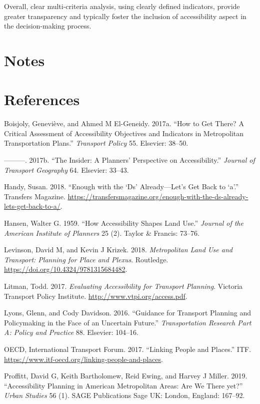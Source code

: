 \documentclass[12pt,]{article}
\begin{document}
Overall, clear multi-criteria analysis, using clearly defined
indicators, provide greater transparency and typically foster the
inclusion of accessibility aspect in the decision-making process.

\hypertarget{notes}{%
\section{Notes}\label{notes}}

\hypertarget{references}{%
\section*{References}\label{references}}

\hypertarget{refs}{}
\leavevmode\hypertarget{ref-boisjoly2017get}{}%
Boisjoly, Geneviève, and Ahmed M El-Geneidy. 2017a. ``How to Get There?
A Critical Assessment of Accessibility Objectives and Indicators in
Metropolitan Transportation Plans.'' \emph{Transport Policy} 55.
Elsevier: 38--50.

\leavevmode\hypertarget{ref-boisjoly2017insider}{}%
---------. 2017b. ``The Insider: A Planners' Perspective on
Accessibility.'' \emph{Journal of Transport Geography} 64. Elsevier:
33--43.

\leavevmode\hypertarget{ref-handy2018enough}{}%
Handy, Susan. 2018. ``Enough with the `Ds' Already---Let's Get Back to
`a'.'' Transfers Magazine.
\url{https://transfersmagazine.org/enough-with-the-ds-already-lets-get-back-to-a/}.

\leavevmode\hypertarget{ref-hansen1959accessibility}{}%
Hansen, Walter G. 1959. ``How Accessibility Shapes Land Use.''
\emph{Journal of the American Institute of Planners} 25 (2). Taylor \&
Francis: 73--76.

\leavevmode\hypertarget{ref-levinson2018metropolitan}{}%
Levinson, David M, and Kevin J Krizek. 2018. \emph{Metropolitan Land Use
and Transport: Planning for Place and Plexus}. Routledge.
\url{https://doi.org/10.4324/9781315684482}.

\leavevmode\hypertarget{ref-litman2017evaluating}{}%
Litman, Todd. 2017. \emph{Evaluating Accessibility for Transport
Planning}. Victoria Transport Policy Institute.
\url{http://www.vtpi.org/access.pdf}.

\leavevmode\hypertarget{ref-lyons2016guidance}{}%
Lyons, Glenn, and Cody Davidson. 2016. ``Guidance for Transport Planning
and Policymaking in the Face of an Uncertain Future.''
\emph{Transportation Research Part A: Policy and Practice} 88. Elsevier:
104--16.

\leavevmode\hypertarget{ref-OECD2017linking}{}%
OECD, International Transport Forum. 2017. ``Linking People and
Places.'' ITF. \url{https://www.itf-oecd.org/linking-people-and-places}.

\leavevmode\hypertarget{ref-proffitt2019accessibility}{}%
Proffitt, David G, Keith Bartholomew, Reid Ewing, and Harvey J Miller.
2019. ``Accessibility Planning in American Metropolitan Areas: Are We
There yet?'' \emph{Urban Studies} 56 (1). SAGE Publications Sage UK:
London, England: 167--92.
\end{document}
